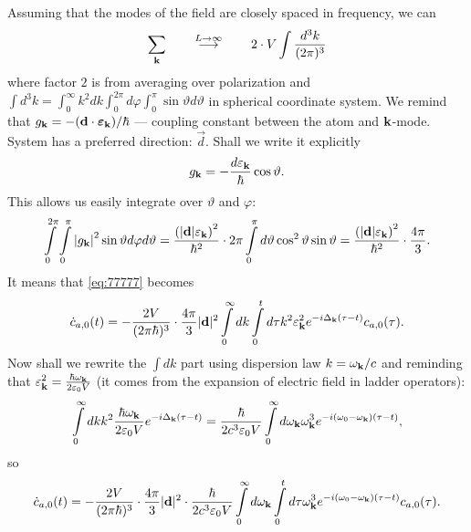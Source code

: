 Assuming that the modes of the field are closely spaced in frequency, we can
\begin{equation}
	\sum_{\mathbf{k}} \qquad \overset{L\to \infty}{\longrightarrow} \qquad 2 \cdot V \int \frac{d^3 k}{(2 \pi)^3}
\end{equation}
where factor $2$ is from averaging over polarization and $\int d^3k = \int_{0}^{\infty} k^2 dk \int_{0}^{2 \pi} d\varphi  \int_{0}^{\pi} \sin \vartheta d \vartheta$ in spherical coordinate system. We remind that $g_{\mathbf{k}} = - (\mathbf{d} \cdot \bm{\varepsilon}_{\mathbf{k}}) / \hbar$ --- coupling constant between the atom and $\mathbf{k}$-mode. System has a preferred direction: $\vec{d}$. Shall we write it explicitly
\begin{equation}
	g_{\mathbf{k}} = - \frac{d \varepsilon_{\mathbf{k}}}{\hbar} \cos \vartheta.
\end{equation}
This allows us easily integrate over $\vartheta$ and $\varphi$:
\begin{equation}
	\int \limits_{0}^{2 \pi} \int \limits_{0}^{\pi} \left| g_{\mathbf{k}} \right|^2 \sin \vartheta d \varphi d \vartheta = \frac{\left(|\mathbf{d}| \varepsilon_{\mathbf{k}}\right)^2}{\hbar^2} \cdot 2 \pi \int \limits_{0}^{\pi} d \vartheta \cos^2 \vartheta \sin \vartheta =  \frac{\left(|\mathbf{d}| \varepsilon_{\mathbf{k}}\right)^2}{\hbar^2} \cdot \frac{4 \pi}{3}.
\end{equation}
It means that \eqref{eq:77777} becomes
\begin{equation}
	\dot{c}_{a,0} (t) = - \frac{2 V}{(2\pi \hbar)^3} \cdot \frac{4 \pi}{3} |\mathbf{d}|^2 \int \limits_{0}^{\infty} dk \int \limits_{0}^{t} d \tau k^2 \varepsilon_{\mathbf{k}}^2 e^{-i \Delta_{\mathbf{k}} (\tau - t)} c_{a,0}(\tau).
\end{equation}
Now shall we rewrite the $\int dk$ part using dispersion law $k = \omega_{\mathbf{k}}/c$ and reminding that $\varepsilon_{\mathbf{k}}^2 = \frac{\hbar \omega_{\mathbf{k}}}{2 \varepsilon_0 V}$ (it comes from the expansion of electric field in ladder operators):
\begin{equation}
	\int \limits_{0}^{\infty} dk k^2 \frac{\hbar \omega_{\mathbf{k}}}{2 \varepsilon_0 V} e^{-i \Delta_{\mathbf{k}} (\tau - t)} = \frac{\hbar}{2 c^3 \varepsilon_0 V} \int \limits_0^{\infty} d \omega_{\mathbf{k}} \omega_{\mathbf{k}}^3 e^{-i (\omega_0 - \omega_{\mathbf{k}})(\tau - t)},
\end{equation}
so
\begin{equation}
	\dot{c}_{a,0} (t) = - \frac{2 V}{(2\pi \hbar)^3} \cdot \frac{4 \pi}{3} |\mathbf{d}|^2 \cdot \frac{\hbar}{2 c^3 \varepsilon_0 V} \int \limits_{0}^{\infty} d \omega_{\mathbf{k}} \int \limits_{0}^{t} d \tau \omega_{\mathbf{k}}^3 e^{-i (\omega_0 - \omega_{\mathbf{k}})(\tau - t)} c_{a,0}(\tau).
\end{equation}
